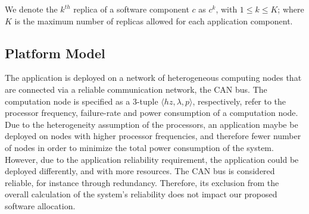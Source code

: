 We denote the $k^{th}$ replica of a software component $c$ as $c^k$, with $1\le k\leq K$; where $K$ is the maximum number of replicas allowed for each application component.

\subsection{Platform Model}
The application is deployed on a network of heterogeneous computing nodes that are connected via a reliable communication network, the CAN bus. The computation node is specified as a 3-tuple $\langle hz, \lambda, p \rangle$, respectively, refer to the processor frequency, failure-rate and power consumption of a computation node. Due to the heterogeneity assumption of the processors, an application maybe be deployed on nodes with higher processor frequencies, and therefore fewer number of nodes in order to minimize the total power consumption of the system. However, due to the application reliability requirement, the application could be deployed differently, and with more resources. The CAN bus is considered reliable, for instance through redundancy. Therefore, its exclusion from the overall calculation of the system's reliability does not impact our proposed software allocation. %


